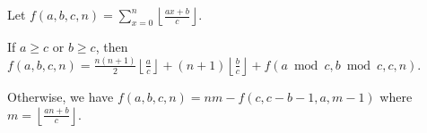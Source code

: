 Let $f(a, b, c, n) = \sum_{x=0}^{n} \left\lfloor \frac{ax+b}{c} \right\rfloor$.

If $a \ge c$ or $b \ge c$, then $f(a, b, c, n) = \frac{n(n+1)}{2} \left\lfloor \frac{a}{c} \right\rfloor + (n+1) \left\lfloor \frac{b}{c} \right\rfloor + f(a \bmod c, b \bmod c, c, n)$.

Otherwise, we have $f(a, b, c, n) = nm - f(c, c-b-1, a, m-1)$ where $m = \left\lfloor \frac{an+b}{c} \right\rfloor$.